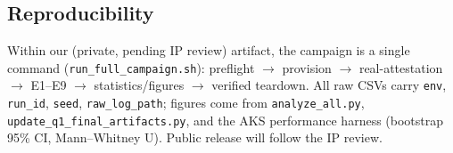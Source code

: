 \subsection{Reproducibility}
Within our (private, pending IP review) artifact, the campaign is a single command
(\texttt{run\_full\_campaign.sh}): preflight $\to$ provision $\to$ real-attestation
$\to$ E1--E9 $\to$ statistics/figures $\to$ verified teardown. All raw CSVs carry
\texttt{env}, \texttt{run\_id}, \texttt{seed}, \texttt{raw\_log\_path}; figures
come from \texttt{analyze\_all.py},
\texttt{update\_q1\_final\_artifacts.py}, and the AKS performance harness
(bootstrap 95\% CI, Mann--Whitney U). Public release will follow the IP review.
